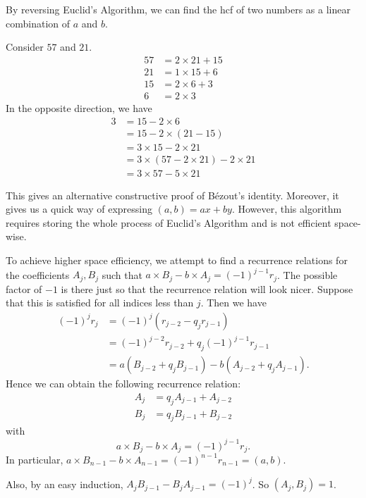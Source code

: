 \documentclass[a4paper]{article}
\begin{document}
By reversing Euclid's Algorithm, we can find the hcf of two numbers as a linear combination of $a$ and $b$.
\begin{eg}
  Consider $57$ and $21$.
  \begin{align*}
    57 &= 2\times 21 + 15\\
    21 &= 1\times 15 + 6\\
    15 &= 2\times 6 + 3\\
    6 &= 2\times 3
  \end{align*}
  In the opposite direction, we have
  \begin{align*}
    3 &= 15 - 2\times 6\\
    &= 15 - 2\times (21 - 15)\\
    &= 3\times 15 - 2\times 21\\
    &= 3\times (57 - 2\times 21) - 2\times 21\\
    &= 3\times 57 - 5\times 21
  \end{align*}
\end{eg}

This gives an alternative constructive proof of B\'{e}zout's identity. Moreover, it gives us a quick way of expressing $(a, b) = ax + by$. However, this algorithm requires storing the whole process of Euclid's Algorithm and is not efficient space-wise.

To achieve higher space efficiency, we attempt to find a recurrence relations for the coefficients $A_j, B_j$ such that $a\times B_j - b \times A_j = (-1)^{j - 1}r_j$. The possible factor of $-1$ is there just so that the recurrence relation will look nicer. Suppose that this is satisfied for all indices less than $j$. Then we have
\begin{align*}
  (-1)^jr_{j} &= (-1)^j(r_{j - 2} - q_jr_{j - 1})\\
  &= (-1)^{j - 2} r_{j - 2} + q_j (-1)^{j - 1} r_{j - 1}\\
  &= a (B_{j - 2} + q_j B_{j - 1}) - b (A_{j - 2} + q_j A_{j - 1}).
\end{align*}
Hence we can obtain the following recurrence relation:
\begin{align*}
  A_j &= q_jA_{j-1} + A_{j-2}\\
  B_j &= q_jB_{j-1} + B_{j-2}
\end{align*}
with
\[
  a\times B_j - b\times A_j = (-1)^{j-1}r_j.
\]
In particular, $a\times B_{n-1} - b\times A_{n-1} = (-1)^{n-1}r_{n - 1} = (a, b)$.

Also, by an easy induction, $A_jB_{j - 1} - B_jA_{j-1} = (-1)^j$. So $(A_j, B_j) = 1$.
\end{document}
